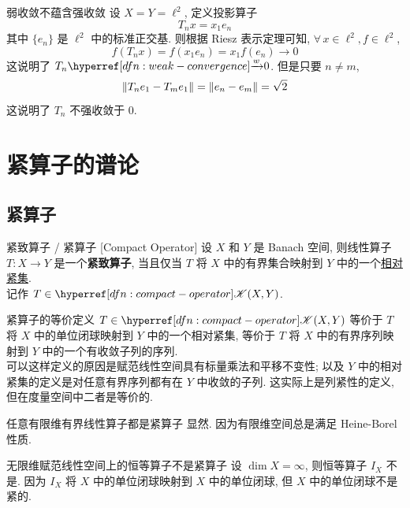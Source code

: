         \begin{cxmp}
            {弱收敛不蕴含强收敛}
            设 \(X=Y=\ell^2\), 定义投影算子
            \[T_nx=x_1e_n\]
            其中 \(\{e_n\}\) 是 \(\ell^2\) 中的标准正交基. 则根据 Riesz 表示定理可知, \(\forall\,x\in\ell^2, f\in\ell^2\), 
            \[f(T_n x) = f(x_1 e_n) = x_1 f(e_n) \to 0\]
            这说明了 \(T_n\wlim 0\). 但是只要 \(n\neq m\), 
            \[\norm{T_ne_1-T_me_1} = \norm{e_n-e_m} = \sqrt{2} \]
            这说明了 \(T_n\) 不强收敛于 \(0\).
        \end{cxmp}

\section{紧算子的谱论}

    \subsection{紧算子}

        \begin{dfn}
            {紧致算子 / 紧算子}
            [Compact Operator]
            设 \(X\) 和 \(Y\) 是 Banach 空间, 则线性算子 \(T:X\to Y\) 是一个\textbf{紧致算子}, 当且仅当 \(T\) 将 \(X\) 中的有界集合映射到 \(Y\) 中的一个\hyperref[dfn:sequential-compact]{相对紧集}.\\
            记作 \(T\in\cpt(X,Y)\).
        \end{dfn}

        \begin{ppt}
            {紧算子的等价定义}
            $T \in\cpt(X,Y)$ 等价于 $T$ 将 \(X\) 中的单位闭球映射到 \(Y\) 中的一个相对紧集, 等价于 \(T\) 将 \(X\) 中的有界序列映射到 \(Y\) 中的一个有收敛子列的序列.\\
            可以这样定义的原因是赋范线性空间具有标量乘法和平移不变性; 以及 $Y$ 中的相对紧集的定义是对任意有界序列都有在 $Y$ 中收敛的子列. 这实际上是列紧性的定义, 但在度量空间中二者是等价的.
        \end{ppt}

        \begin{ppt}
            {任意有限维有界线性算子都是紧算子}
            显然. 因为有限维空间总是满足 Heine-Borel 性质.
        \end{ppt}

        \begin{cxmp}
            {无限维赋范线性空间上的恒等算子不是紧算子}
            设 \(\dim X= \infty\), 则恒等算子 \(I_X\) 不是\CompactOp{}. 因为 \(I_X\) 将 \(X\) 中的单位闭球映射到 \(X\) 中的单位闭球, 但 \(X\) 中的单位闭球不是紧的.
        \end{cxmp}

